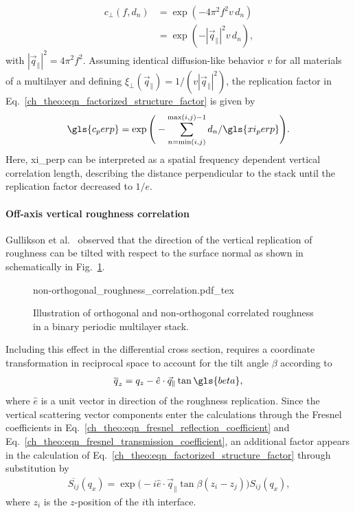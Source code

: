 \begin{align}
    c_\perp(f,d_n) &= \exp(-4\pi^2 f^2 v \,d_n) \nonumber \\
                   &= \exp(-|\vec{q}_\parallel|^2 v \,d_n)\text{,}
\end{align}
with $|\vec{q}_\parallel|^2 = 4 \pi^2 f^2$. Assuming identical diffusion-like behavior $v$ for all materials of a multilayer and defining $\xi_\perp(\vec{q}_\parallel) = 1/(v |\vec{q}_\parallel|^2)$, the replication factor in Eq.~\eqref{ch_theo:eqn_factorized_structure_factor} is given by
\begin{align}
\gls{c_perp} =  \exp\Bigg(-\sum \limits_{n = \text{min}(i,j)}^{\text{max}(i,j)-1}d_n/\gls{xi_perp} \Bigg)\text{.} \label{ch_theo:eqn_replication_factor}
\end{align}
Here, \gls{xi_perp} can be interpreted as a spatial frequency dependent vertical correlation length, describing the distance perpendicular to the stack until the replication factor decreased to $1/e$.



\paragraph{Off-axis vertical roughness correlation}
Gullikson et al.~\cite{gullikson_asymmetric_1999} observed that the direction of the vertical replication of roughness can be tilted with respect to the surface normal as shown in schematically in Fig.~\ref{ch_theo:fig_non-orthogonal_vertical_roughness_correlation}.
\begin{figure}[htb]
    \def\svgwidth{\textwidth}
    {non-orthogonal_roughness_correlation.pdf_tex}
    \caption{Illustration of orthogonal and non-orthogonal correlated roughness in a binary periodic multilayer stack.}
    \label{ch_theo:fig_non-orthogonal_vertical_roughness_correlation}
\end{figure}
Including this effect in the differential cross section, requires a coordinate transformation in reciprocal space to account for the tilt angle $\beta$ according to
\begin{align}
\overline{q}_z = q_z - \hat{e} \cdot \vec{q}_\parallel   \tan \gls{beta} \text{,} \label{ch_theo:eqn_off_axis_vertical_roughness_correlation_angle}
\end{align}
where $\hat{e}$ is a unit vector in direction of the roughness replication. Since the vertical scattering vector components enter the calculations through the Fresnel coefficients in Eq.~\eqref{ch_theo:eqn_fresnel_reflection_coefficient} and Eq.~\eqref{ch_theo:eqn_fresnel_transmission_coefficient}, an additional factor appears in the calculation of Eq.~\eqref{ch_theo:eqn_factorized_structure_factor} through substitution by
\begin{align}
\overline{S_{ij}}(q_x) = \exp\Big(-i \hat{e} \cdot \vec{q}_\parallel \tan \beta (z_i-z_j)\Big)  S_{ij}(q_x) \text{,} \label{eqn:tilt_correction}
\end{align}
where $z_i$ is the $z$-position of the $i$th interface.

